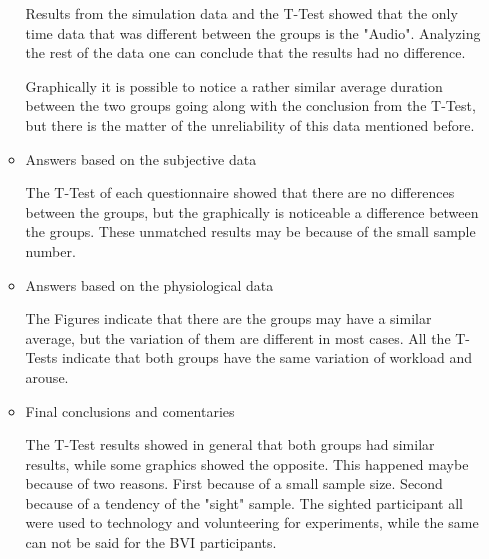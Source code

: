 \begin{itemize}
\begin{itemize}
    Results from the simulation data and the T-Test showed that the only time data that was different between the groups is the "Audio". Analyzing the rest of the data one can conclude that the results had no difference.

    Graphically it is possible to notice a rather similar average duration between the two groups going along with the conclusion from the T-Test, but there is the matter of the unreliability of this data mentioned before.

    \item Answers based on the subjective data

    The T-Test of each questionnaire showed that there are no differences between the groups, but the graphically is noticeable a difference between the groups. These unmatched results may be because of the small sample number.

    \item Answers based on the physiological data

    The Figures indicate that there are the groups may have a similar average, but the variation of them are different in most cases. All the T-Tests indicate that both groups have the same variation of workload and arouse.

    
    \item Final conclusions and comentaries

    The T-Test results showed in general that both groups had similar results, while some graphics showed the opposite. This happened maybe because of two reasons. First because of a small sample size. Second because of a tendency of the "sight" sample. The sighted participant all were used to technology and volunteering for experiments, while the same can not be said for the BVI participants.

    \end{itemize}
\end{itemize}




